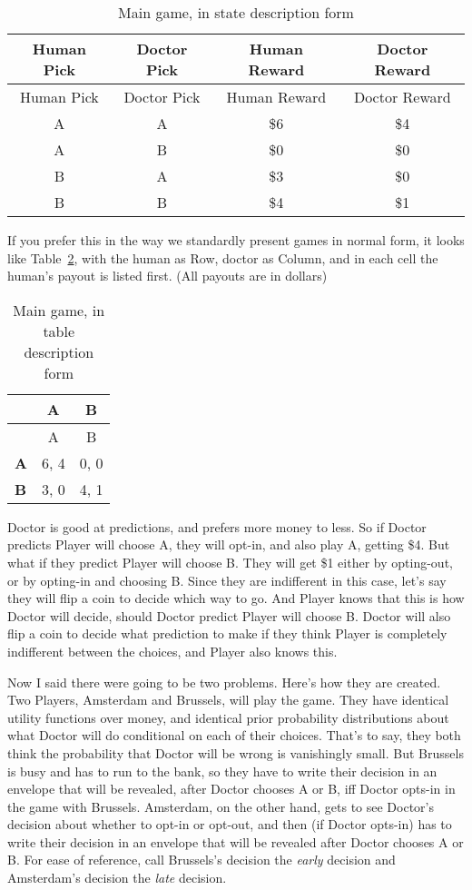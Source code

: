 \documentclass[
  10pt,
  letterpaper,
  DIV=11,
  numbers=noendperiod,
  twoside]{scrartcl}
\begin{document}
\begin{longtable}[]{@{}cccc@{}}
\caption{Main game, in state description
form}\label{tbl-main-game-state}\tabularnewline
\toprule\noalign{}
Human Pick & Doctor Pick & Human Reward & Doctor Reward \\
\midrule\noalign{}
\endfirsthead
\toprule\noalign{}
Human Pick & Doctor Pick & Human Reward & Doctor Reward \\
\midrule\noalign{}
\endhead
\bottomrule\noalign{}
\endlastfoot
A & A & \$6 & \$4 \\
A & B & \$0 & \$0 \\
B & A & \$3 & \$0 \\
B & B & \$4 & \$1 \\
\end{longtable}

If you prefer this in the way we standardly present games in normal
form, it looks like Table~\ref{tbl-main-game-table}, with the human as
Row, doctor as Column, and in each cell the human's payout is listed
first. (All payouts are in dollars)

\begin{longtable}[]{@{}lcc@{}}
\caption{Main game, in table description
form}\label{tbl-main-game-table}\tabularnewline
\toprule\noalign{}
& A & B \\
\midrule\noalign{}
\endfirsthead
\toprule\noalign{}
& A & B \\
\midrule\noalign{}
\endhead
\bottomrule\noalign{}
\endlastfoot
\textbf{A} & 6, 4 & 0, 0 \\
\textbf{B} & 3, 0 & 4, 1 \\
\end{longtable}

Doctor is good at predictions, and prefers more money to less. So if
Doctor predicts Player will choose A, they will opt-in, and also play A,
getting \$4. But what if they predict Player will choose B. They will
get \$1 either by opting-out, or by opting-in and choosing B. Since they
are indifferent in this case, let's say they will flip a coin to decide
which way to go. And Player knows that this is how Doctor will decide,
should Doctor predict Player will choose B. Doctor will also flip a coin
to decide what prediction to make if they think Player is completely
indifferent between the choices, and Player also knows this.

Now I said there were going to be two problems. Here's how they are
created. Two Players, Amsterdam and Brussels, will play the game. They
have identical utility functions over money, and identical prior
probability distributions about what Doctor will do conditional on each
of their choices. That's to say, they both think the probability that
Doctor will be wrong is vanishingly small. But Brussels is busy and has
to run to the bank, so they have to write their decision in an envelope
that will be revealed, after Doctor chooses A or B, iff Doctor opts-in
in the game with Brussels. Amsterdam, on the other hand, gets to see
Doctor's decision about whether to opt-in or opt-out, and then (if
Doctor opts-in) has to write their decision in an envelope that will be
revealed after Doctor chooses A or B. For ease of reference, call
Brussels's decision the \emph{early} decision and Amsterdam's decision
the \emph{late} decision.
\end{document}

